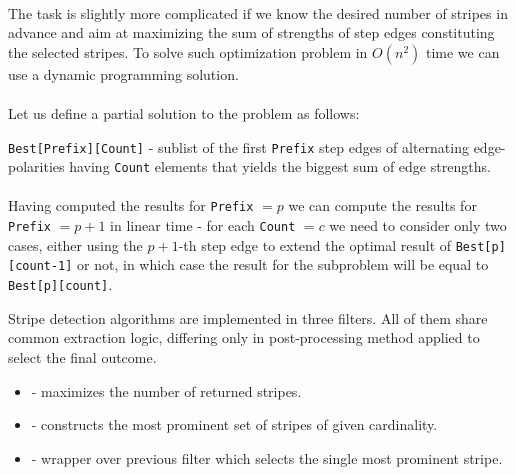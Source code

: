 \paragraph*{}
The task is slightly more complicated if we know the desired number of stripes in advance and aim at maximizing the sum of strengths of step edges constituting the selected stripes. To solve such optimization problem in $O(n^2)$ time we can use a dynamic programming solution.

\paragraph*{}
Let us define a partial solution to the problem as follows:
\begin{description}
	\item \texttt{Best[Prefix][Count]} - sublist of the first \texttt{Prefix} step edges of alternating edge-polarities having \texttt{Count} elements that yields the biggest sum of edge strengths.
\end{description}

\paragraph*{}
Having computed the results for \texttt{Prefix} $=p$ we can compute the results for \texttt{Prefix} $=p+1$ in linear time - for each \texttt{Count} $=c$ we need to consider only two cases, either using the $p+1$-th step edge to extend the optimal result of \texttt{Best[p][count-1]} or not, in which case the result for the subproblem will be equal to \texttt{Best[p][count]}.

\begin{refImpl}
Stripe detection algorithms are implemented in three \studio filters. All of them share common extraction logic, differing only in post-processing method applied to select the final outcome.
\begin{itemize}
	\item {} - maximizes the number of returned stripes.
	\item {} - constructs the most prominent set of stripes of given cardinality.
	\item {} - wrapper over previous filter which selects the single most prominent stripe.
\end{itemize} 
\end{refImpl}